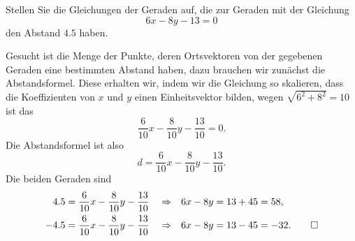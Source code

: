 Stellen Sie die Gleichungen der Geraden auf, die zur Geraden mit der
Gleichung
\[
6x-8y-13=0
\]
den Abstand $4.5$ haben.


\begin{loesung}
Gesucht ist die Menge der Punkte, deren Ortsvektoren von der gegebenen
Geraden eine bestimmten Abstand haben, dazu brauchen wir zunächst die
Abstandsformel. Diese erhalten wir, indem wir die Gleichung so skalieren,
dass die Koeffizienten von $x$ und $y$ einen Einheitsvektor bilden,
wegen $\sqrt{6^2+8^2}=10$ ist das
\[
\frac{6}{10}x-\frac{8}{10}y-\frac{13}{10}=0.
\]
Die Abstandsformel ist also
\[
d =\frac{6}{10}x-\frac{8}{10}y-\frac{13}{10}.
\]
Die beiden Geraden sind
\begin{align*}
4.5&=\frac{6}{10}x-\frac{8}{10}y-\frac{13}{10}&&\Rightarrow&
6x-8y&=13+45=58,
\\
-4.5&=\frac{6}{10}x-\frac{8}{10}y-\frac{13}{10}&&\Rightarrow&
6x-8y&=13-45=-32.
\qedhere
\end{align*}
\end{loesung}

